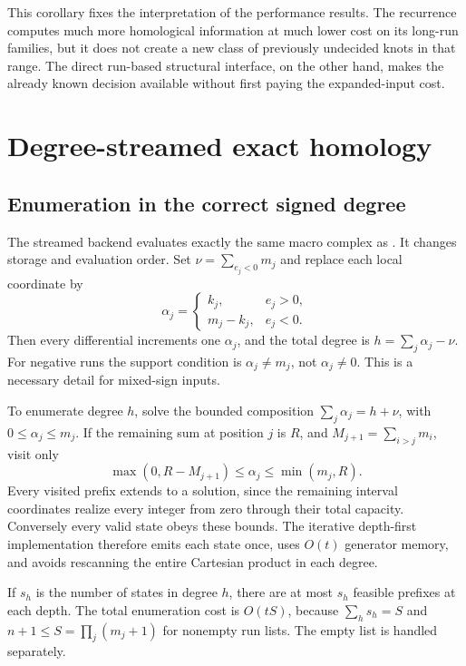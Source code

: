 This corollary fixes the interpretation of the performance results.
The recurrence computes much more homological information at much lower
cost on its long-run families, but it does not create a new class of
previously undecided knots in that range. The direct run-based structural
interface, on the other hand, makes the already known decision available
without first paying the expanded-input cost.

\section{Degree-streamed exact homology}\label{sec:streaming}

\subsection{Enumeration in the correct signed degree}

The streamed backend evaluates exactly the same macro complex as
. It changes storage and evaluation order.
Set \(\nu=\sum_{e_j<0}m_j\) and replace each local coordinate by
\[
\alpha_j=\begin{cases}
k_j,&e_j>0,\\
m_j-k_j,&e_j<0.
\end{cases}
\]
Then every differential increments one \(\alpha_j\), and the total degree
is \(h=\sum_j\alpha_j-\nu\).
For negative runs the support condition is \(\alpha_j\ne m_j\), not
\(\alpha_j\ne0\). This is a necessary detail for mixed-sign inputs.

To enumerate degree \(h\), solve the bounded composition
\(\sum_j\alpha_j=h+\nu\), with \(0\le\alpha_j\le m_j\).
If the remaining sum at position \(j\) is \(R\), and
\(M_{j+1}=\sum_{i>j}m_i\), visit only
\begin{equation}\label{eq:composition}
\max(0,R-M_{j+1})\le\alpha_j\le\min(m_j,R).
\end{equation}
Every visited prefix extends to a solution, since the remaining interval
coordinates realize every integer from zero through their total
capacity. Conversely every valid state obeys these bounds.
The iterative depth-first implementation therefore emits each state
once, uses \(O(t)\) generator memory, and avoids rescanning the entire
Cartesian product in each degree.

If \(s_h\) is the number of states in degree \(h\), there are at most
\(s_h\) feasible prefixes at each depth. The total enumeration cost is
\(O(tS)\), because
\(\sum_hs_h=S\) and \(n+1\le S=\prod_j(m_j+1)\) for nonempty run lists.
The empty list is handled separately.


